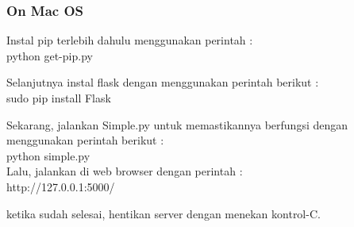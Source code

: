 \documentclass[12pt,a4paper]{article}
\begin{document}
\subsubsection{On Mac OS}
\item Instal pip terlebih dahulu menggunakan perintah :\\
	python get-pip.py\\

\item Selanjutnya instal flask dengan menggunakan perintah berikut :\\
	sudo pip install Flask\\

\item Sekarang, jalankan Simple.py untuk memastikannya berfungsi dengan menggunakan perintah berikut :\\
	python simple.py\\

Lalu, jalankan di web browser dengan perintah :\\
http://127.0.0.1:5000/

ketika sudah selesai, hentikan server dengan menekan kontrol-C.
\end{document}
